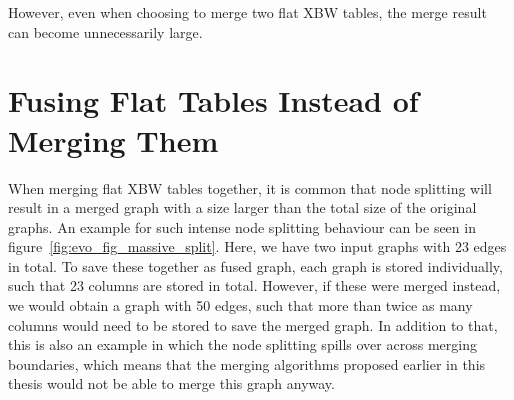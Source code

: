 \documentclass[a4paper,12pt,twoside,BCOR=10mm]{scrbook}
\begin{document}
However, even when choosing to merge two flat XBW tables,
the merge result can become unnecessarily large.


\section{Fusing Flat Tables Instead of Merging Them}
%

When merging flat XBW tables together, it is common that node splitting
will result in a merged graph with a size larger than the total size of the
original graphs. An example for such intense node splitting behaviour can
be seen in figure~\ref{fig:evo_fig_massive_split}.
Here, we have two input graphs with 23 edges in total.
To save these together as fused graph, each graph is stored individually,
such that 23 columns are stored in total.
However, if these were merged instead, we would obtain a graph with 50 edges,
such that more than twice as many columns would need to be stored to save the
merged graph.
In addition to that, this is also an example in which the node splitting spills over
across merging boundaries, which means that the merging algorithms proposed earlier
in this thesis would not be able to merge this graph anyway.
\end{document}
